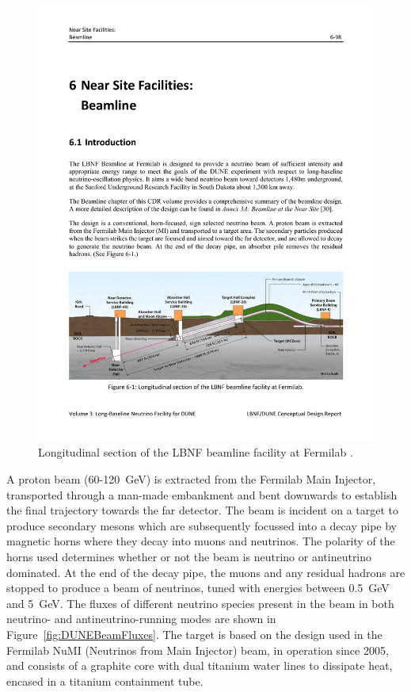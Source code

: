 \begin{figure}
  \centering
  \includegraphics[width=14cm]{DUNEBeam.pdf}
  \caption{Longitudinal section of the LBNF beamline facility at Fermilab \cite{DUNECDR3}.}
  \label{fig:DUNEBeam}
\end{figure}

A proton beam (60-120~GeV) is extracted from the Fermilab Main Injector, transported through a man-made embankment and bent downwards to establish the final trajectory towards the far detector.  The beam is incident on a target to produce secondary mesons which are subsequently focussed into a decay pipe by magnetic horns where they decay into muons and neutrinos.  The polarity of the horns used determines whether or not the beam is neutrino or antineutrino dominated.  At the end of the decay pipe, the muons and any residual hadrons are stopped to produce a beam of neutrinos, tuned with energies between 0.5~GeV and 5~GeV.  The fluxes of different neutrino species present in the beam in both neutrino- and antineutrino-running modes are shown in Figure~\ref{fig:DUNEBeamFluxes}.  The target is based on the design used in the Fermilab NuMI (Neutrinos from Main Injector) beam, in operation since 2005, and consists of a graphite core with dual titanium water lines to dissipate heat, encased in a titanium containment tube.

